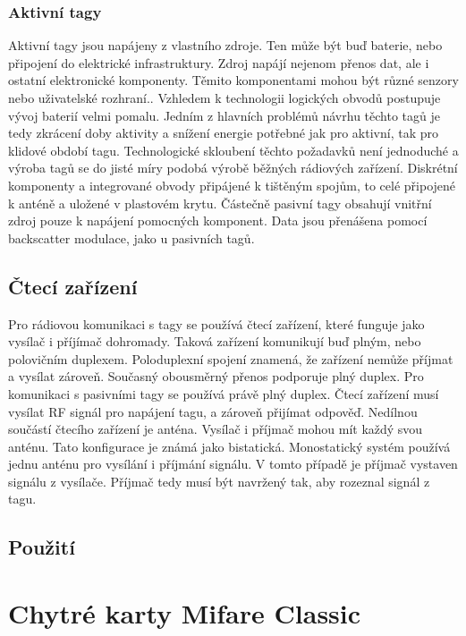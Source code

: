 \subsection{Aktivní tagy} %
Aktivní tagy jsou napájeny z vlastního zdroje. Ten může být buď baterie, nebo připojení do elektrické infrastruktury. Zdroj napájí nejenom přenos dat, ale i ostatní elektronické komponenty. Těmito komponentami mohou být různé senzory nebo uživatelské rozhraní.\cite{RFID_explained}. Vzhledem k technologii logických obvodů postupuje vývoj baterií velmi pomalu. Jedním z hlavních problémů návrhu těchto tagů je tedy zkrácení doby aktivity a snížení energie potřebné jak pro aktivní, tak pro klidové období tagu. Technologické skloubení těchto požadavků není jednoduché a výroba tagů se do jisté míry podobá výrobě běžných rádiových zařízení. Diskrétní komponenty a integrované obvody připájené k tištěným spojům, to celé připojené k anténě a uložené v plastovém krytu\cite{The_RF_in_RFID}. 
Částečně pasivní tagy obsahují vnitřní zdroj pouze k napájení pomocných komponent. Data jsou přenášena pomocí backscatter modulace, jako u pasivních tagů\cite{Survey_of_RFID_Tags}.


\section{Čtecí zařízení}
Pro rádiovou komunikaci s tagy se používá čtecí zařízení, které funguje jako vysílač i příjímač dohromady. Taková zařízení komunikují buď plným, nebo polovičním duplexem. Poloduplexní spojení znamená, že zařízení nemůže příjmat a vysílat zároveň. Současný obousměrný přenos podporuje plný duplex. Pro komunikaci s pasivními tagy se používá právě plný duplex. Čtecí zařízení musí vysílat RF signál pro napájení tagu, a zároveň přijímat odpověď.
Nedílnou součástí čtecího zařízení je anténa. Vysílač i příjmač mohou mít každý svou anténu. Tato konfigurace je známá jako bistatická. Monostatický systém používá jednu anténu pro vysílání i příjmání signálu. V tomto případě je příjmač vystaven signálu z vysílače. Příjmač tedy musí být navržený tak, aby rozeznal signál z tagu\cite{The_RF_in_RFID}.\par

\section{Použití}


\chapter{Chytré karty Mifare Classic}
\label{chytre_karty_mifare_classic}

